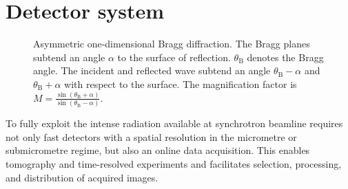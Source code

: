 \documentclass[
twoside,
openright,
titlepage,
numbers=noenddot,
headinclude,
fleqn,
a4paper,
footinclude=true,
cleardoublepage=empty,
abstractoff,
BCOR=5mm,
paper=a4,
fontsize=11pt,
british,ngerman,american,
]{scrreprt}
\begin{document}


\section{Detector system}
\label{sec:detector}

\begin{figure}
  \centering
  \caption[Asymmetric one-dimensional Bragg diffraction in a Bragg
  magnifier.]{Asymmetric one-dimensional Bragg diffraction. The Bragg
    planes subtend an angle $\alpha$ to the surface of reflection.
    $\theta_{\mathrm{B}}$ denotes the Bragg angle.  The incident and
    reflected wave subtend an angle $\theta_{\mathrm{B}}-\alpha$ and
    $\theta_{\mathrm{B}}+\alpha$ with respect to the surface.  The
    magnification factor is $M =
    \frac{\sin(\theta_{\mathrm{B}}+\alpha)}{\sin(\theta_{\mathrm{B}}-\alpha)}$.}
  \label{fig:bragg-magnifier}
\end{figure}

To fully exploit the intense radiation available at synchrotron
beamline requires not only fast detectors with a spatial resolution in
the micrometre or submicrometre regime, but also an online data
acquisition.  This enables tomography and time-resolved experiments
and facilitates selection, processing, and distribution of acquired
images.
\end{document}
